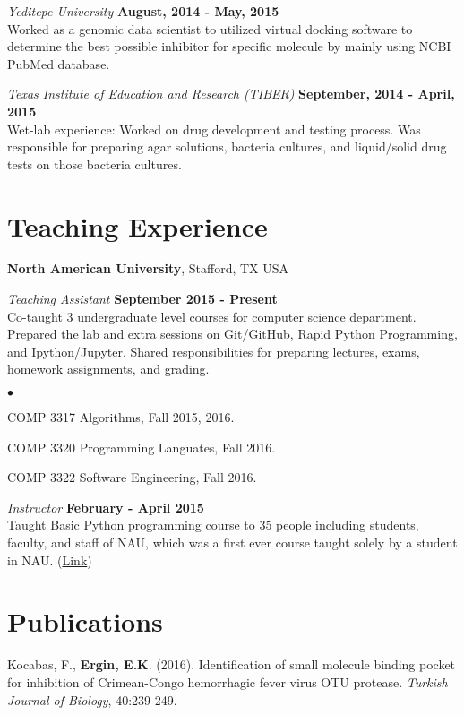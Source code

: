 \documentclass[margin,line]{res}
\newenvironment{list2}{
  \begin{list}{$\bullet$}{%
      \setlength{\itemsep}{0in}
      \setlength{\parsep}{0in} \setlength{\parskip}{0in}
      \setlength{\topsep}{0in} \setlength{\partopsep}{0in} 
      \setlength{\leftmargin}{0.2in}}}{\end{list}}
\begin{document}
\begin{resume}
{\em Yeditepe University} \hfill {\bf August, 2014 - May, 2015}\\
Worked as a genomic data scientist to utilized virtual docking software to determine the best possible inhibitor for specific molecule by mainly using NCBI PubMed database.  

{\em Texas Institute of Education and Research (TIBER)} \hfill {\bf September, 2014 - April, 2015}\\
Wet-lab experience: Worked on drug development and testing process. Was responsible for preparing agar solutions, bacteria cultures, and liquid/solid drug tests on those bacteria cultures. 


\section{\sc Teaching Experience}
{\bf North American University}, Stafford, TX USA

\vspace{-.3cm}
{\em Teaching Assistant} \hfill {\bf September 2015 - Present}\\
Co-taught 3 undergraduate level courses for computer science department. Prepared the lab and extra sessions on Git/GitHub, Rapid Python Programming, and Ipython/Jupyter. Shared responsibilities for preparing lectures, exams, homework assignments, and  grading.
\vspace*{.05in}  
\begin{list2}
\item COMP 3317 Algorithms, Fall 2015, 2016.
\item COMP 3320 Programming Languates, Fall 2016.
\item COMP 3322 Software Engineering, Fall 2016.
\end{list2}

\vspace{-.3cm}
{\em Instructor} \hfill {\bf February - April 2015}\\
Taught Basic Python programming course to 35 people including students, faculty, and staff of NAU, which was a first ever course taught solely by a student in NAU. (\href{https://github.com/NAU-Python-Class/Py101-Spring-15}{Link})


\section{\sc Publications}
Kocabas, F., {\bf Ergin, E.K}. (2016). Identification of small molecule binding pocket for inhibition of Crimean-Congo hemorrhagic fever virus OTU protease. {\em Turkish Journal of Biology}, 40:239-249.




\end{resume}
\end{document}
